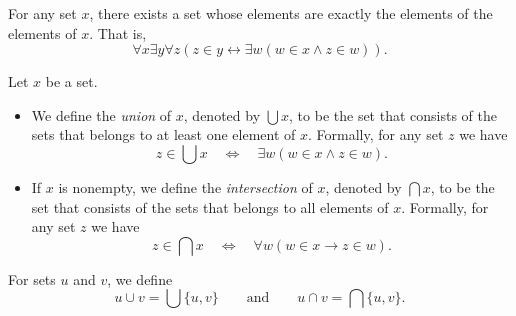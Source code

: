 \begin{axiom}[Union]
  For any set $x$, there exists a set whose elements are exactly the
  elements of the elements of $x$.
  That is,
  \begin{equation*}
    \forall x \exists y \forall z
    (z \in y \leftrightarrow \exists w (w \in x \wedge z \in w)).
  \end{equation*}
\end{axiom}

\begin{definition}
  Let $x$ be a set.
  \begin{itemize}
    \item We define the \emph{union} of $x$, denoted by $\bigcup x$, to be the
    set that consists of the sets that belongs to at least one element of $x$.
    Formally, for any set $z$ we have
    \begin{equation*}
      z \in \bigcup x
      \quad \Leftrightarrow \quad
      \exists w (w \in x \wedge z \in w).
    \end{equation*}
    \item If $x$ is nonempty, we define the \emph{intersection} of $x$, denoted
    by $\bigcap x$, to be the set that consists of the sets that belongs to all
    elements of $x$.
    Formally, for any set $z$ we have
    \begin{equation*}
      z \in \bigcap x
      \quad \Leftrightarrow \quad
      \forall w (w \in x \to z \in w).
    \end{equation*}
  \end{itemize}
  For sets $u$ and $v$, we define
  \begin{equation*}
    u \cup v = \bigcup \{u, v\}
    \qquad \text{and} \qquad
    u \cap v = \bigcap \{u, v\}.
  \end{equation*}
\end{definition}
